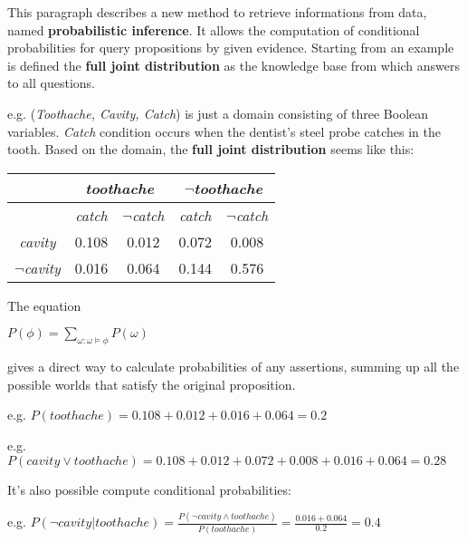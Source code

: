 This paragraph describes a new method to retrieve informations from data, named \textbf{probabilistic inference}.
It allows the computation of conditional probabilities for query propositions by given evidence.
Starting from an example is defined the \textbf{full joint distribution} as the knowledge base from which answers to all questions.
\begin{example}
  e.g. (\textit{Toothache, Cavity, Catch}) is just a domain consisting of three Boolean variables. \textit{Catch} condition occurs when the dentist's steel probe catches in the tooth. Based on the domain, the \textbf{full joint distribution} seems like this:
  \begin{center}
        \begin{table}[H]
            \centering
            \begin{tabular}{|c|c|c|c|c|}
                \hline
                \multicolumn{1}{|c|}{} & \multicolumn{2}{|c|}{\it toothache} & \multicolumn{2}{|c|}{\it $\neg$toothache} \\
                \hline
                \it & \it catch & \it $\neg$catch & \it catch & \it $\neg$catch \\
                \it cavity & 0.108 & 0.012 & 0.072 & 0.008 \\
                \it $\neg$cavity & 0.016 & 0.064 & 0.144 & 0.576 \\
                \hline
            \end{tabular}
        \end{table}
    \end{center}
    The equation 
    \begin{center}
        $P(\phi) = \sum_{\omega:\omega\models\phi}P(\omega)$
    \end{center}
    gives a direct way to calculate probabilities of any assertions, summing up all the possible worlds that satisfy the original proposition. \vspace{3.5pt}

    e.g. $P(toothache) = 0.108 + 0.012 + 0.016 + 0.064 = 0.2$ 

    e.g. $P(cavity \vee toothache) = 0.108 + 0.012 + 0.072 + 0.008 + 0.016 + 0.064 = 0.28$

    It's also possible compute conditional probabilities: \vspace*{3.5pt}

    e.g. $P(\neg cavity|toothache) = \frac{P(\neg cavity \land toothache)}{P(toothache)} = \frac{0.016 + 0.064}{0.2} = 0.4$ \vspace{3.5pt}


\end{example}
